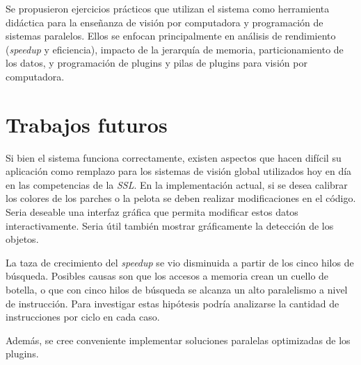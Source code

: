 Se propusieron ejercicios prácticos que utilizan el sistema como herramienta
didáctica para la enseñanza de visión por computadora y programación de sistemas
paralelos. Ellos se enfocan principalmente en análisis de rendimiento
(\emph{speedup} y eficiencia), impacto de la jerarquía de memoria,
particionamiento de los datos, y programación de plugins y pilas de plugins para
visión por computadora.

\section{Trabajos futuros}

\label{trabajosFuturos}

Si bien el sistema funciona correctamente, existen aspectos que hacen difícil su
aplicación como remplazo para los sistemas de visión global utilizados hoy en
día en las competencias de la \emph{SSL}. En la implementación actual, si se
desea calibrar los colores de los parches o la pelota se deben realizar
modificaciones en el código. Seria deseable una interfaz gráfica que permita
modificar estos datos interactivamente. Seria útil también mostrar gráficamente
la detección de los objetos.

La taza de crecimiento del \emph{speedup} se vio disminuida a partir de los cinco
hilos de búsqueda. Posibles causas son que los accesos a memoria crean un cuello
de botella, o que con cinco hilos de búsqueda se alcanza un alto paralelismo a
nivel de instrucción. Para investigar estas hipótesis podría analizarse la
cantidad de instrucciones por ciclo en cada caso.

Además, se cree conveniente implementar soluciones paralelas optimizadas de los
plugins.

